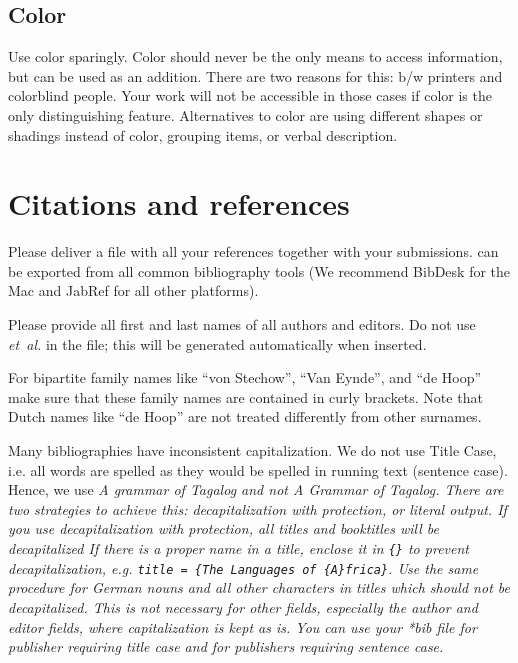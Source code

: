 {\subsection{Color}
Use color sparingly. Color should never be the only means to access information, but can be used as an addition. There are two reasons for this: b/w printers and colorblind people. Your work will not be accessible in those cases if color is the only distinguishing feature. Alternatives to color are using different shapes or shadings instead of color, grouping items, or verbal description. 




\section{Citations and references}
\label{sec-references-authors}

Please deliver a \bibtex file with all your references together with your submissions. 
\bibtex can be exported from all common bibliography tools (We recommend BibDesk for the Mac and JabRef for all other platforms). 

Please provide all first and last names of all authors and editors. Do not use {\em et~al.}  in the \bibtex file; this will be generated automatically when inserted.

For bipartite family names like ``von Stechow'', ``Van Eynde'', and ``de Hoop'' make sure that these
family names are contained in curly brackets.
 Note that Dutch names like ``de Hoop'' are not treated differently from other surnames.

Many bibliographies have inconsistent capitalization. We do not use Title Case, i.e. all words are spelled as they would be spelled in running text (sentence case). Hence, we use \em A grammar of Tagalog \em and not \em A Grammar of Tagalog\em. There are two strategies to achieve this: decapitalization with protection, or literal output. If you use decapitalization with protection, all titles and booktitles will be decapitalized  If there is a proper name in a title, enclose it in \verb+{}+ to prevent decapitalization, e.g. \verb+title = {The Languages of {A}frica}+. Use the same procedure for German nouns and all other characters in titles which should not be decapitalized. This is not necessary for other fields, especially the author and editor fields, where capitalization is kept as is. You can use your *bib file for publisher requiring title case and for publishers requiring sentence case.

}

